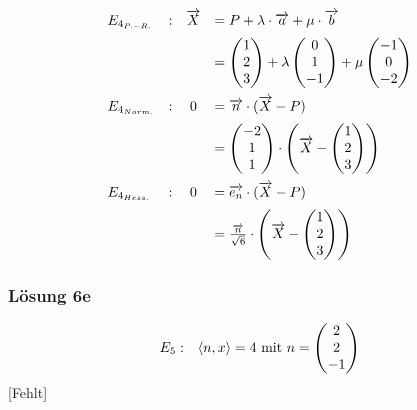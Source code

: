 \begin{equation*}
	\begin{array}{ l l c l }
		E_{4_{P.-R.}} & : & \vec{X} & =P+\lambda \cdotp \vec{a} +\mu \cdotp \vec{b}\vspace{2mm}\\
		&  &  & =\begin{pmatrix}
			1\\
			2\\
			3
		\end{pmatrix} +\lambda \begin{pmatrix}
			0\\
			1\\
			-1
		\end{pmatrix} +\mu \begin{pmatrix}
			-1\\
			0\\
			-2
		\end{pmatrix}\vspace{2mm}\\
		E_{4_{Norm.}} & : & 0 & =\vec{n} \cdotp (\vec{X} -P)\vspace{2mm}\\
		&  &  & =\begin{pmatrix}
			-2\\
			1\\
			1
		\end{pmatrix} \cdotp \left(\vec{X} -\begin{pmatrix}
			1\\
			2\\
			3
		\end{pmatrix}\right)\vspace{2mm}\\
		E_{4_{Hess.}} & : & 0 & =\overrightarrow{e_{n}} \cdotp (\vec{X} -P)\vspace{2mm}\\
		&  &  & =\frac{\vec{n}}{\sqrt{6}} \cdotp \left(\vec{X} -\begin{pmatrix}
			1\\
			2\\
			3
		\end{pmatrix}\right)
	\end{array}
\end{equation*}

\subsubsection{Lösung 6e}
\begin{equation*}
	\begin{array}{ r l }
		E_{5} : & \langle n,x\rangle =4\ \text{mit} \ n=\begin{pmatrix}
			2\\
			2\\
			-1
		\end{pmatrix}
	\end{array}
\end{equation*}
[Fehlt]
